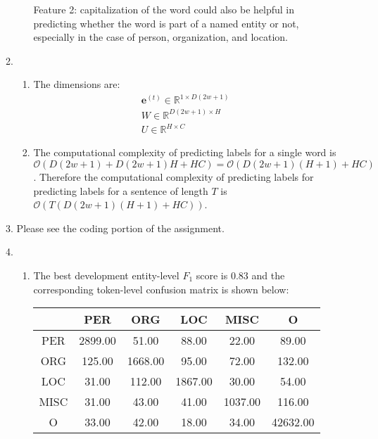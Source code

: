 \documentclass[10pt,reqno]{amsart}
\begin{document}
\begin{enumerate}[topsep=0pt,itemsep=3ex,partopsep=1ex,parsep=1ex]
\begin{enumerate}[itemsep=2ex]
\begin{enumerate}[itemsep=2ex]
        Feature 2: capitalization of the word could also be helpful in predicting 
        whether the word is part of a named entity or not, especially in the case of
        person, organization, and location. 
    \end{enumerate}
  \item 
    \begin{enumerate}[itemsep=2ex]
      \item The dimensions are:
        \begin{align*}
          \bm{e}^{(t)} \in \mathbb{R}^{1 \times D(2w+1)} \\
          W \in \mathbb{R}^{D(2w+1) \times H} \\
          U \in \mathbb{R}^{H \times C} 
        \end{align*}
      \item The computational complexity of predicting labels for a single word is
        $\mathcal{O}(D(2w+1) + D(2w+1)H + HC) = \mathcal{O}(D(2w+1)(H+1) + HC)$.
        Therefore the computational complexity of predicting labels for predicting labels for
        a sentence of length $T$ is
        $\mathcal{O}(T (D(2w+1)(H+1) + HC))$.
    \end{enumerate}
  \item Please see the coding portion of the assignment.
  \item 
    \begin{enumerate}[itemsep=2ex]
      \item The best development entity-level $F_1$ score is 0.83 and 
        the corresponding token-level confusion matrix is shown below:
        \vspace{1mm}
        \begin{center}
          \begin{tabular}{c|c|c|c|c|c}
             & PER  &   ORG  &   LOC  &   MISC  &  O       \\
            \hline
            PER  &   2899.00 & 51.00   & 88.00   & 22.00    & 89.00   \\
            \hline
            ORG  &   125.00  & 1668.00 & 95.00   & 72.00    & 132.00  \\
            \hline
            LOC  &   31.00   & 112.00  & 1867.00 & 30.00    & 54.00   \\
            \hline
            MISC &   31.00   & 43.00   & 41.00   &  1037.00 &  116.00  \\
            \hline
            O    &   33.00   & 42.00   & 18.00   &  34.00   &  42632.00

\end{tabular}
\end{center}
\end{enumerate}
\end{enumerate}
\end{enumerate}
\end{document}

